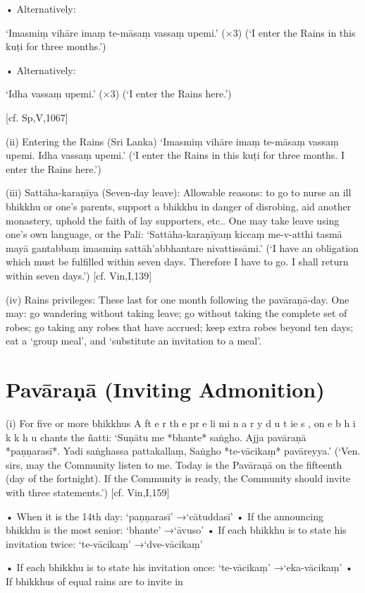 • Alternatively:

‘Imasmiṃ vihāre
imaṃ te-māsaṃ vassaṃ upemi.’ (×3)
(‘I enter the Rains in this kuṭi for three months.’)

• Alternatively:

‘Idha vassaṃ upemi.’ (×3)
(‘I enter the Rains here.’)

[cf. Sp,V,1067]

(ii) Entering the Rains (Sri Lanka)
‘Imasmiṃ vihāre
imaṃ te-māsaṃ vassaṃ upemi.
Idha vassaṃ upemi.’
(‘I enter the Rains in this kuṭi for three months.
I enter the Rains here.’)

(iii) Sattāha-karaṇīya (Seven-day leave):
Allowable reasons: to go to nurse an ill
bhikkhu or one’s parents, support a bhikkhu
in danger of disrobing, aid another monastery, uphold the faith of lay supporters, etc..
One may take leave using one’s own language,
or the Pali:
‘Sattāha-karaṇīyaṃ kiccaṃ me-v-atthi
tasmā mayā gantabbaṃ imasmiṃ
sattāh’abbhantare nivattissāmi.’
(‘I have an obligation which must be fulfilled within
seven days. Therefore I have to go. I shall return
within seven days.’)
[cf. Vin,I,139]

(iv) Rains privileges:
These last for one month following the
pavāraṇā-day. One may: go wandering without taking leave; go without taking the complete set of robes; go taking any robes that
have accrued; keep extra robes beyond ten
days; eat a ‘group meal’, and ‘substitute an
invitation to a meal’.

\section{Pavāraṇā (Inviting Admonition)}

(i) For five or more bhikkhus
A ft e r th e pr e li mi n a r y d u t ie s , on e b h i k k h u
chants the ñatti:
‘Suṇātu me *bhante* saṅgho.
Ajja pavāraṇā *paṇṇarasī*.
Yadi saṅghassa pattakallaṃ,
Saṅgho *te-vācikaṃ* pavāreyya.’
(‘Ven. sirs, may the Community listen to me. Today
is the Pavāraṇā on the fifteenth (day of the
fortnight). If the Community is ready, the
Community should invite with three statements.’)
[cf. Vin,I,159]

• When it is the 14th day:
‘paṇṇarasī’ →‘cātuddasī’
• If the announcing bhikkhu is the most senior:
‘bhante’ →‘āvuso’
• If each bhikkhu is to state his invitation twice:
‘te-vācikaṃ’ →‘dve-vācikaṃ’

• If each bhikkhu is to state his invitation once:
‘te-vācikaṃ’ →‘eka-vācikaṃ’
• If bhikkhus of equal rains are to invite in

